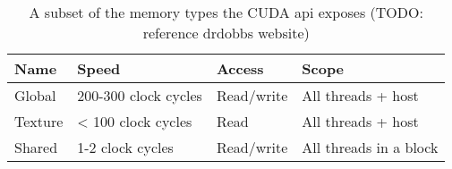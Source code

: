 \begin{table}[htb]
	\centering
	\begin{tabular}{llll}
		\toprule
		Name 	& Speed & Access & Scope\\
		\midrule
		Global 	& 200-300 clock cycles 	& Read/write & All threads + host \\
		Texture 	& < 100 clock cycles & Read & All threads + host\\
		Shared 	& 1-2 clock cycles & Read/write & All threads in a block\\
		\bottomrule
	\end{tabular}
	\caption{A subset of the memory types the CUDA api exposes (TODO: reference drdobbs website)}
	\label{cudamemtable}
\end{table}

